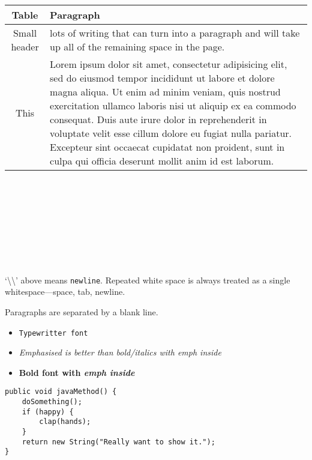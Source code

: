 \begin{center}
\begin{tabu}{c X}
	\toprule
	Table & Paragraph \\
	\midrule
	Small header & lots of writing that can turn into a paragraph and will take
	up all of the remaining space in the page. \\
	This & Lorem ipsum dolor sit amet, consectetur adipisicing elit, sed do
	eiusmod tempor incididunt ut labore et dolore magna aliqua. Ut enim ad
	minim veniam, quis nostrud exercitation ullamco laboris nisi ut aliquip ex
	ea commodo consequat. Duis aute irure dolor in reprehenderit in voluptate
	velit esse cillum dolore eu fugiat nulla pariatur. Excepteur sint occaecat
	cupidatat non proident, sunt in culpa qui officia deserunt mollit anim id
	est laborum. \\
	\bottomrule
\end{tabu}
\end{center}

\cite{rasband1997imagej} \\
\cite{fang2005sub} \\
\cite{williamson2011pre} \\
\cite{rust2006sub} \\
\cite{owen2010palm} \\

 \\
 \\
 \\

`\textbackslash\textbackslash' above means \texttt{newline}. Repeated white
space is always treated as a single whitespace---space, tab, newline.

Paragraphs are separated by a blank line.

\begin{itemize}
	\item \texttt{Typewritter font}
	\item \emph{Emphasised is better than bold/italics with \emph{emph} inside}
	\item \textbf{Bold font with \emph{emph inside}}
\end{itemize}

\begin{lstlisting}[caption={This is the caption}]
public void javaMethod() {
	doSomething();
	if (happy) {
		clap(hands);
	}
	return new String("Really want to show it.");
}
\end{lstlisting}
